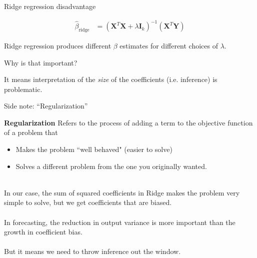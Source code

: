 \documentclass[mathserif, aspectratio=169]{beamer}
\begin{document}
\begin{frame}{Ridge regression disadvantage}

\begin{align*}
\hat{\beta}_\text{ridge} &=\left(\mathbf{X}^T\mathbf{X} + \lambda\mathbf{I}_k\right)^{-1} \left(\mathbf{X}^T\mathbf{Y}\right)
\end{align*}

\pause
Ridge regression produces different $\beta$ estimates for different choices of $\lambda$.

\vspace{5mm}

Why is that important?
\pause
\vspace{5mm}

It means interpretation of the \textit{size} of the coefficients (i.e. inference) is problematic.

\end{frame}


\begin{frame}{Side note:  ``Regularization''}

\textbf{Regularization} Refers to the process of adding a term to the objective function of a problem that 
\begin{itemize}
\item Makes the problem ``well behaved" (easier to solve)
\item Solves a different problem from the one you originally wanted.\\~\\
\end{itemize}

In our case, the sum of squared coefficients in Ridge makes the problem very simple to solve, but we get coefficients that are biased.\\~\\

In forecasting, the reduction in output variance is more important than the growth in coefficient bias.   \\~\\

But it means we need to throw inference out the window.  


\end{frame}
\end{document}
